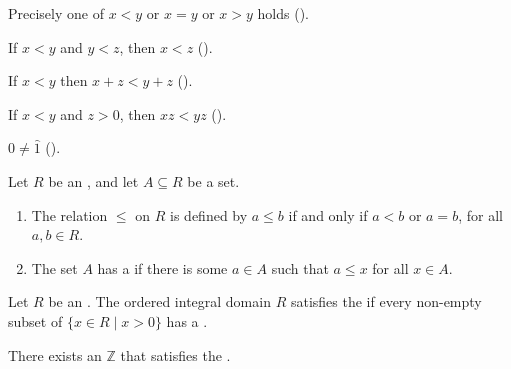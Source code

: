 \begin{definition}
\begin{lenumerate}
		      Precisely one of $x < y$ or $x = y$ or $x > y$ holds \quad ().
		\item {}
		      If $x < y$ and $y < z$, then $x < z$ \quad ().
		\item {}
		      If $x < y$ then $x + z < y + z$ \quad ().
		\item {}
		      If $x < y$ and $z > 0$, then $x z < y z$ \quad ().
		\item {}
		      $0 \neq \hat{1}$ \quad ().
	\end{lenumerate}
\end{definition}

\begin{definition} %
	Let $R$ be an , and let $A \subseteq R$ be a set.
	\begin{enumerate}
		\item The relation $\leq$ on $R$ is defined by $a \leq b$ if and only if $a < b$ or $a = b$, for all $a, b \in R$.
		\item {}
		      The set $A$ has a \emph{} if there is some $a \in A$ such that $a \leq x$ for all $x \in A$.
	\end{enumerate}
\end{definition}

\begin{definition} %
	Let $R$ be an . The ordered integral domain $R$ satisfies the \emph{} if every non-empty subset of $\{x \in R \mid x > 0 \}$
	has a .
\end{definition}

\begin{axiom}  %
	There exists an  $\mathbb{Z}$ that satisfies the .
\end{axiom}

